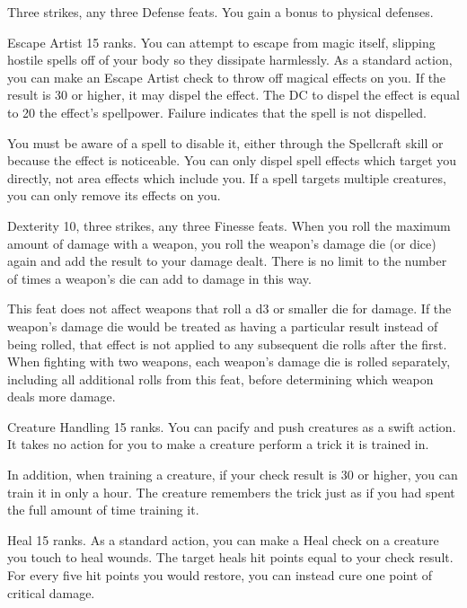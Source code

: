 \featpres Three strikes, any three Defense feats.
\featben You gain a  bonus to physical defenses.

\featpre Escape Artist 15 ranks.
\featben You can attempt to escape from magic itself, slipping hostile spells off of your body so they dissipate harmlessly.
As a standard action, you can make an Escape Artist check to throw off magical effects on you.
If the result is 30 or higher, it may dispel the effect.
The DC to dispel the effect is equal to 20 \add the effect's spellpower.
Failure indicates that the spell is not dispelled.

You must be aware of a spell to disable it, either through the Spellcraft skill or because the effect is noticeable.
You can only dispel spell effects which target you directly, not area effects which include you.
If a spell targets multiple creatures, you can only remove its effects on you.

\featpres Dexterity 10, three strikes, any three Finesse feats.
\featben When you roll the maximum amount of damage with a weapon, you roll the weapon's damage die (or dice) again and add the result to your damage dealt.
There is no limit to the number of times a weapon's die can add to damage in this way.

This feat does not affect weapons that roll a d3 or smaller die for damage.
If the weapon's damage die would be treated as having a particular result instead of being rolled, that effect is not applied to any subsequent die rolls after the first.
When fighting with two weapons, each weapon's damage die is rolled separately, including all additional rolls from this feat, before determining which weapon deals more damage.

\featpre Creature Handling 15 ranks.
\featben You can pacify and push creatures as a swift action.
It takes no action for you to make a creature perform a trick it is trained in.

In addition, when training a creature, if your check result is 30 or higher, you can train it in only a hour.
The creature remembers the trick just as if you had spent the full amount of time training it.

\featpre Heal 15 ranks.
\featben As a standard action, you can make a Heal check on a creature you touch to heal wounds.
The target heals hit points equal to your check result.
For every five hit points you would restore, you can instead cure one point of critical damage.

